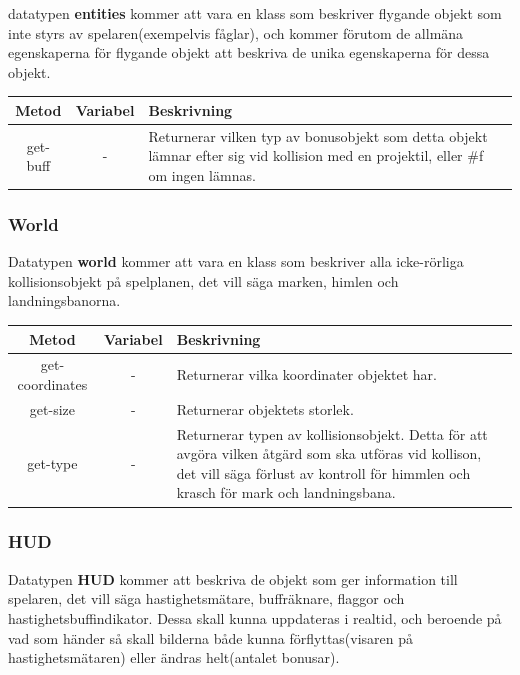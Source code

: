 \documentclass[12pt,a4paper]{article}
\newcounter{subsubsubsection}[subsubsection]
\begin{document}
datatypen \textbf{entities} kommer att vara en klass som beskriver flygande objekt som inte styrs av spelaren(exempelvis fåglar), och kommer förutom de allmäna egenskaperna för flygande objekt att beskriva de unika egenskaperna för dessa objekt. \\

\begin{tabular}{| c | c | p{9.5cm} |}
	\hline
	\textbf{Metod} & \textbf{Variabel} & \textbf{Beskrivning} \\
	\hline
	
	get-buff & - & Returnerar vilken typ av bonusobjekt som detta objekt lämnar efter sig vid kollision med en projektil, eller \#f om ingen lämnas.\\
	\hline
	
\end{tabular}

\subsubsection{World}
Datatypen \textbf{world} kommer att vara en klass som beskriver alla icke-rörliga kollisionsobjekt på spelplanen, det vill säga marken, himlen och landningsbanorna. \\

\begin{tabular}{| c | c | p{8cm} |}
	\hline
	\textbf{Metod} & \textbf{Variabel} & \textbf{Beskrivning} \\
	\hline
	
	get-coordinates & - & Returnerar vilka koordinater objektet har. \\
	\hline
	get-size & - & Returnerar objektets storlek. \\
	\hline
	get-type & - & Returnerar typen av kollisionsobjekt. Detta för att avgöra vilken åtgärd som ska utföras vid kollison, det vill säga förlust av kontroll för himmlen och krasch för mark och landningsbana. \\
	\hline
\end{tabular}

\subsubsection{HUD}
Datatypen \textbf{HUD} kommer att beskriva de objekt som ger information till spelaren, det vill säga hastighetsmätare, buffräknare, flaggor och hastighetsbuffindikator. Dessa skall kunna uppdateras i realtid, och beroende på vad som händer så skall bilderna både kunna förflyttas(visaren på hastighetsmätaren) eller ändras helt(antalet bonusar).
\end{document}
